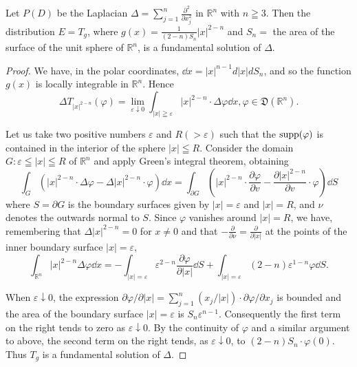 \begin{examplen} Let $P(D)$ be the Laplacian $\Delta = \sum\limits_{j=1}^{n} \frac{\partial^2}{\partial x_j^2}$ in $\mathbb{R}^{n}$ with $n \geqq 3$. Then the distribution
$E = T_{g}$, where $g(x) = \frac{1}{(2 - n)S_n} |x|^{2-n}$ and $S_{n} =$ the area of the surface of the unit sphere of $\mathbb{R}^{n}$, 
is a fundamental solution of $\Delta$. 

\end{examplen}
\begin{proof}
 We have, in the polar coordinates, $\dd x = |x|^{n-1} d |x| dS_n$, and so the function $g(x)$ is locally integrable in $\mathbb{R}^{n}$. Hence 
\[
\Delta T _ {| x | ^{2-n}} (\varphi) = \lim\limits _{\varepsilon \downarrow 0} \int_{| x | \geqq \varepsilon} | x | ^{2-n} \cdot \Delta \varphi \dd x, \varphi \in \mathfrak {D} (\mathbb{R}^{n}). \]

Let us take two positive numbers $\varepsilon$ and $R (> \varepsilon)$ such that the $\operatorname{supp}(\varphi)$ is contained in the interior of the sphere $|x| \leqq R$. Consider the domain $G: \varepsilon \leqq |x| \leqq R$ of $\mathbb{R}^{n}$ and apply Green's integral theorem, obtaining 
\[
\int_{G} \left(| x | ^{2-n} \cdot \Delta \varphi - \Delta | x | ^{2-n} \cdot \varphi\right) \dd x = \int_{\partial G} \left(| x | ^{2-n} \cdot \frac {\partial \varphi}{\partial v} - \frac {\partial | x | ^{2-n}}{\partial v} \cdot \varphi\right) \dd S
\]
where $S = \partial G$ is the boundary surfaces given by $|x| = \varepsilon$ and $|x| = R$, and $\nu$ denotes the outwards normal to $S$. Since $\varphi$ vanishes around $|x| = R$, we have, remembering that $\Delta |x|^{2-n} = 0$ for $x \neq 0$ and that $-\frac{\partial}{\partial\nu} = \frac{\partial}{\partial|x|}$ at the points of the inner boundary surface $|x| = \varepsilon$, 
\[
\int_ {\mathbb{R}^{n}} | x | ^{2-n} \Delta \varphi \dd x = - \int_{| x | = \varepsilon} \varepsilon^{2-n} \frac {\partial \varphi}{\partial | x |} \dd S + \int_{| x | = \varepsilon} (2 - n) \varepsilon^{1-n} \varphi \dd S.
\]

When $\varepsilon \downarrow 0$, the expression $\partial \varphi / \partial |x| = \sum\limits_{j=1}^{n} (x_j / |x|) \cdot \partial \varphi / \partial x_j$ is bounded and the area of the boundary surface $|x| = \varepsilon$ is $S_n \varepsilon^{n-1}$. Consequently the first term on the right tends to zero as $\varepsilon \downarrow 0$. By the continuity of $\varphi$ and a similar argument to above, the second term on the right tends, as $\varepsilon \downarrow 0$, to $(2 - n) S_n \cdot \varphi(0)$. Thus $T_g$ is a fundamental solution of $\Delta$. 
\end{proof}

